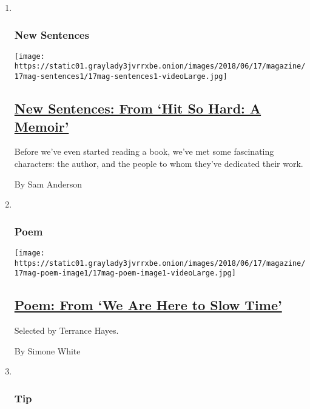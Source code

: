 \begin{enumerate}
\def\labelenumi{\arabic{enumi}.}
\item ~
  \hypertarget{new-sentences}{%
  \subsubsection{New Sentences}\label{new-sentences}}

  \texttt{[image: https://static01.graylady3jvrrxbe.onion/images/2018/06/17/magazine/17mag-sentences1/17mag-sentences1-videoLarge.jpg]}

  \hypertarget{new-sentences-from-hit-so-hard-a-memoir}{%
  \subsection{\texorpdfstring{\href{/2018/06/13/magazine/new-sentences-from-hit-so-hard-a-memoir.html}{New
  Sentences: From `Hit So Hard: A
  Memoir'}}{New Sentences: From `Hit So Hard: A Memoir'}}\label{new-sentences-from-hit-so-hard-a-memoir}}

  Before we've even started reading a book, we've met some fascinating
  characters: the author, and the people to whom they've dedicated their
  work.

  By Sam Anderson
\item ~
  \hypertarget{poem}{%
  \subsubsection{Poem}\label{poem}}

  \texttt{[image: https://static01.graylady3jvrrxbe.onion/images/2018/06/17/magazine/17mag-poem-image1/17mag-poem-image1-videoLarge.jpg]}

  \hypertarget{poem-from-we-are-here-to-slow-time}{%
  \subsection{\texorpdfstring{\href{/2018/06/13/magazine/poem-from-we-are-here-to-slow-time.html}{Poem:
  From `We Are Here to Slow
  Time'}}{Poem: From `We Are Here to Slow Time'}}\label{poem-from-we-are-here-to-slow-time}}

  Selected by Terrance Hayes.

  By Simone White
\item ~
  \hypertarget{tip}{%
  \subsubsection{Tip}\label{tip}}


\end{enumerate}
